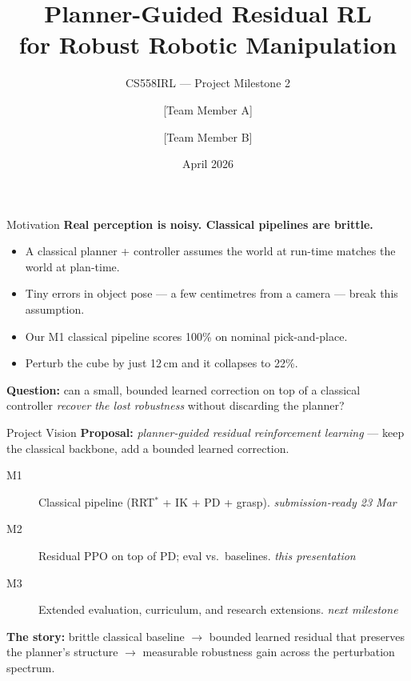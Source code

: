 \documentclass[aspectratio=169, 10pt]{beamer}
\title{Planner-Guided Residual RL \\ for Robust Robotic Manipulation}
\subtitle{CS558IRL --- Project Milestone 2}
\author{[Team Member A] \and [Team Member B]}
\institute{Purdue University}
\date{April 2026}
\begin{document}
\begin{frame}
  \titlepage
\end{frame}


\begin{frame}{Motivation}
  \textbf{Real perception is noisy. Classical pipelines are brittle.}

  \vspace{1em}
  \begin{itemize}
    \item A classical planner + controller assumes the world at run-time
          matches the world at plan-time.
    \item Tiny errors in object pose --- a few centimetres from a camera
          --- break this assumption.
    \item Our M1 classical pipeline scores \alert{100\%} on nominal pick-and-place.
    \item Perturb the cube by just \alert{12\,cm} and it collapses to \alert{22\%}.
  \end{itemize}

  \vspace{1em}
  \textbf{Question:} can a small, bounded learned correction on top of a
  classical controller \emph{recover the lost robustness} without
  discarding the planner?
\end{frame}

\begin{frame}{Project Vision}
  \textbf{Proposal:} \emph{planner-guided residual reinforcement learning} ---
  keep the classical backbone, add a bounded learned correction.

  \vspace{1em}
  \begin{description}
    \item[\textcolor{accent}{M1}] Classical pipeline (RRT$^*$ + IK + PD + grasp).
          \hfill \textit{submission-ready 23 Mar}
    \item[\textcolor{accent2}{M2}] Residual PPO on top of PD; eval vs.\ baselines.
          \hfill \textit{this presentation}
    \item[\textcolor{accent3}{M3}] Extended evaluation, curriculum, and
          research extensions. \hfill \textit{next milestone}
  \end{description}

  \vspace{1em}
  \textbf{The story:} brittle classical baseline \(\rightarrow\) bounded
  learned residual that preserves the planner's structure \(\rightarrow\)
  measurable robustness gain across the perturbation spectrum.
\end{frame}
\end{document}
